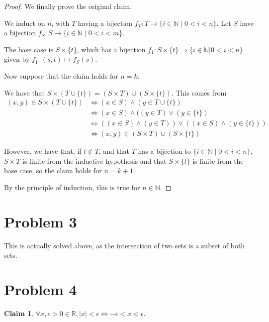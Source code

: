\documentclass[12pt,letterpaper]{article}
\theoremstyle{definition}
\newtheorem*{claim}{Claim}
\newcommand{\R}{\mathbb{R}}
\newcommand{\N}{\mathbb{N}}
\begin{document}
\begin{proof}
    We finally prove the original claim.

    We induct on $n$, with $T$ having a bijection $f_T: T \rightarrow \{i \in \N \mid 0 < i < n\}$.
    Let $S$ have a bijection $f_S: S \rightarrow \{i \in \N \mid 0 < i < m\}$.

    The base case is $S \times \{t\}$, which has a bijection $f_1: S\times \{t\} \Rightarrow  \{i \in \N | 0 < i < n\}$
    given by $f_1: (s,t) \mapsto f_S(s)$.

    Now suppose that the claim holds for $n = k$.

    We have that $S \times (T \cup \{t\}) = (S \times T) \cup (S \times \{t\})$.
    This comes from 
    \begin{align*}
        (x,y) \in S \times (T \cup \{t\}) &\iff (x \in S) \land (y \in T \cup \{t\}) \\
        &\iff (x \in S) \land ((y \in T) \lor (y \in \{t\}) \\
        &\iff ((x \in S) \land (y \in T)) \lor ((x\in S) \land (y \in \{t\})) \\
        &\iff (x,y) \in (S \times T) \cup (S \times \{t\})
    \end{align*}

    However, we have that, if $t \notin T$, and that $T$ has a bijection to $\{i \in \N \mid 0 < i < n\}$, $S \times T$ is finite from the inductive hypothesis and that
    $S \times \{t\}$ is finite from the base case, so the claim holds for $n = k+1$.

    By the principle of induction, this is true for $n \in \N$.
\end{proof}

\section*{Problem 3}

This is actually solved above, as the intersection of two sets is a subset of both sets.

\section*{Problem 4}

\begin{claim}
    $\forall x, \epsilon > 0 \in \R, |x| < \epsilon \iff -\epsilon < x < \epsilon$.
\end{claim}
\end{document}
